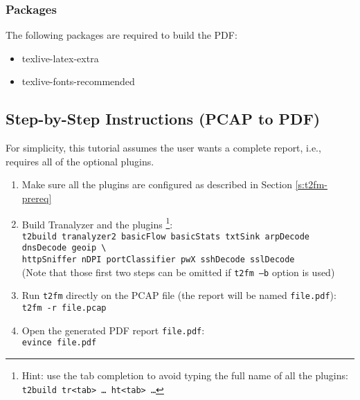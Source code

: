 \documentclass[documentation]{subfiles}
\begin{document}
    \subsubsection{Packages}
        The following packages are required to build the PDF:
        \begin{multicols}{3}
            \begin{itemize}
                \item texlive-latex-extra
                \item texlive-fonts-recommended
            \end{itemize}
        \end{multicols}

\subsection{Step-by-Step Instructions (PCAP to PDF)}\label{t2fm-pcap-pdf}

For simplicity, this tutorial assumes the user wants a complete report, i.e., requires all of the optional plugins.

\begin{enumerate}
    \item Make sure all the plugins are configured as described in Section \ref{s:t2fm-prereq}
    \item Build Tranalyzer and the plugins
        \footnote{Hint: use the tab completion to avoid typing the full name of all the plugins: {\tt t2build tr<tab>~\ldots~ht<tab>~\ldots}}:\\
        {\tt t2build tranalyzer2 basicFlow basicStats txtSink arpDecode dnsDecode geoip \textbackslash{}}\\
        {\tt httpSniffer nDPI portClassifier pwX sshDecode sslDecode}\\
        (Note that those first two steps can be omitted if {\tt t2fm --b} option is used)
    \item Run {\tt t2fm} directly on the PCAP file (the report will be named {\tt file.pdf}):\\
        {\tt t2fm -r file.pcap}
    \item Open the generated PDF report {\tt file.pdf}:\\
        {\tt evince file.pdf}
\end{enumerate}
\end{document}
